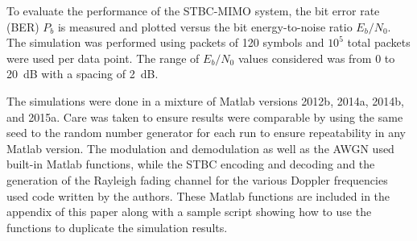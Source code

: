 To evaluate the performance of the STBC-MIMO system, the bit error rate (BER) $P_b$ is measured and plotted versus the bit energy-to-noise ratio $E_b/N_0$. The simulation was performed using packets of 120 symbols and $10^5$ total packets were used per data point. The range of $E_b/N_0$ values considered was from 0 to 20~dB with a spacing of 2~dB.

The simulations were done in a mixture of Matlab versions 2012b, 2014a, 2014b, and 2015a. Care was taken to ensure results were comparable by using the same seed to the random number generator for each run to ensure repeatability in any Matlab version. The modulation and demodulation as well as the AWGN used built-in Matlab functions, while the STBC encoding and decoding and the generation of the Rayleigh fading channel for the various Doppler frequencies used code written by the authors. These Matlab functions are included in the appendix of this paper along with a sample script showing how to use the functions to duplicate the simulation results.